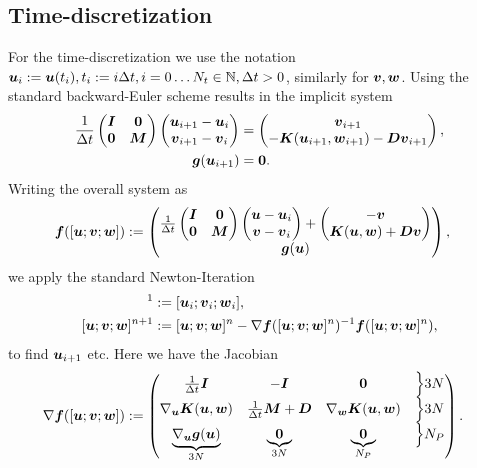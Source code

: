 \subsection{Time-discretization}
For the time-discretization we use the notation $\vu_i := \vu(t_i), t_i := i\Delta t, i=0\ldots N_t\in\N, \Delta t > 0$, similarly for $\vv,\vw$.
Using the standard backward-Euler scheme results in the implicit system
\begin{align}
	\frac{1}{\Delta t}\m{\vI & \vnull\\ \vnull & \vM}\m{\vu_{i+1}-\vu_i\\\vv_{i+1}-\vv_i} 
	&= \m{\vv_{i+1}\\-\vK(\vu_{i+1},\vw_{i+1})-\vD\vv_{i+1}},\\
	\vg(\vu_{i+1})		&= \vnull.
\end{align}
Writing the overall system as 
\begin{align}
	\vf([\vu; \vv; \vw]) &:= \m{\frac{1}{\Delta t}\m{\vI & \vnull\\ \vnull & \vM}\m{\vu-\vu_i\\\vv-\vv_i} 
	+ \m{-\vv\\\vK(\vu,\vw)+\vD\vv}\\
		\vg(\vu)},
\end{align}
we apply the standard Newton-Iteration
\begin{align}
	[\vu; \vv; \vw]^1 &:= [\vu_i; \vv_i; \vw_i],\\
	[\vu; \vv; \vw]^{n+1} &:= [\vu; \vv; \vw]^{n} - \nabla \vf([\vu; \vv; \vw]^n)^{-1}\vf([\vu; \vv; \vw]^n), 
\end{align}
to find $\vu_{i+1}$ etc.
Here we have the Jacobian
\begin{align}
	 \nabla \vf([\vu; \vv; \vw]) &:= \m{\frac{1}{\Delta t} \vI & -\vI & \vnull & \Bigl\rbrace3N\\
	 									\nabla_{\vu}\vK(\vu,\vw) & \frac{1}{\Delta t}\vM+\vD & \nabla_{\vw}\vK(\vu,\vw) & \Bigl\rbrace3N\\
	 									\underbrace{\nabla_{\vu}\vg(\vu)}_{3N} & \underbrace{\vnull}_{3N} & \underbrace{\vnull}_{N_P} & \Bigl\rbrace N_P}.
\end{align}

